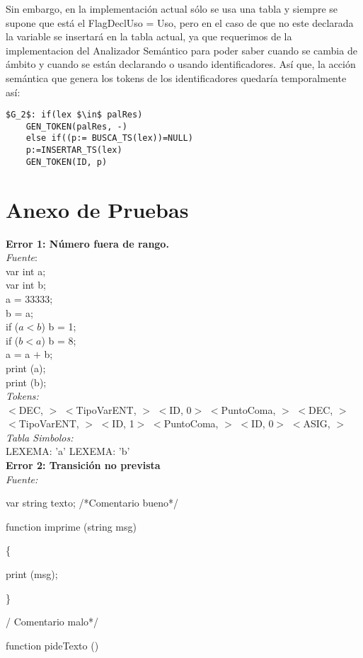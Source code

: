 \documentclass[a4paper, 12pt]{article}
\begin{document}
Sin embargo, en la implementación actual sólo se usa una tabla y siempre se supone que está el FlagDeclUso = Uso, pero en el caso de que no este declarada la variable se insertará en la tabla actual, ya que requerimos de la implementacion del Analizador Semántico para poder saber cuando se cambia de ámbito y cuando se están declarando o usando identificadores. Así que, la acción semántica que genera los tokens de los identificadores quedaría temporalmente así:
\begin{lstlisting}
$G_2$: if(lex $\in$ palRes)
	GEN_TOKEN(palRes, -)
    else if((p:= BUSCA_TS(lex))=NULL)
	p:=INSERTAR_TS(lex)
	GEN_TOKEN(ID, p)
\end{lstlisting}

\section{Anexo de Pruebas}

\textbf{Error 1: Número fuera de rango.} \\ 
\emph{Fuente}: \\
var int a; \\
var int b;\\
a = 33333;\\
b = a;\\
 if ($a  <  b$) b  =  1; \\
if ($b  <  a$) b  =  8;\\
 a = a  $+$  b;\\
print (a);\\
print (b);\medskip\\
\emph{Tokens:}\\ 
 $<$DEC, $>$ 
 $<$TipoVarENT, $>$ 
 $<$ID, 0$>$ 
 $<$PuntoComa, $>$ 
 $<$DEC, $>$ 
 $<$TipoVarENT, $>$ 
 $<$ID, 1$>$ 
 $<$PuntoComa, $>$ 
 $<$ID, 0$>$ 
 $<$ASIG, $>$\medskip\\
\emph{Tabla Simbolos:}\\
  LEXEMA: 'a'
  LEXEMA: 'b'\bigskip \\
\textbf{Error 2: Transición no prevista}\medskip\\
\emph{Fuente:} 


var string texto; /*Comentario bueno*/

 function imprime (string msg)
 
\{

	print (msg);
	
\} 

/ Comentario malo*/

function pideTexto () 
\end{document}
